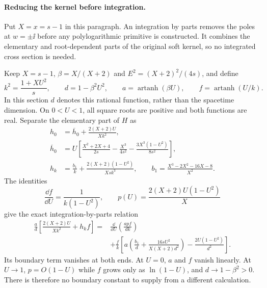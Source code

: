 \paragraph{Reducing the kernel before integration.}
Put $X=x=s-1$ in this paragraph. An integration by parts removes the
poles at $w=\pm\ii$ before any polylogarithmic primitive is constructed.
It combines the elementary and root-dependent parts of the original
soft kernel, so no integrated cross section is needed.

Keep $X=s-1$, $\beta=X/(X+2)$ and $E^2=(X+2)^2/(4s)$, and define
\begin{equation}
 k^2=\frac{1+XU^2}{s},\qquad d=1-\beta^2U^2,\qquad
 a=\operatorname{artanh}(\beta U),\qquad
 f=\operatorname{artanh}(U/k).
\end{equation}
In this section $d$ denotes this rational function, rather than the
spacetime dimension.  On $0<U<1$, all square roots are positive and
both functions are real.  Separate the elementary part of $H$ as
\begin{align}
 h_0&=\overline h_0+\frac{2(X+2)U}{Xk^2},\\
 \overline h_0&=U\left[\frac{X^2+2X+4}{2s}
 -\frac{X^3}{4s^2}-\frac{3X^3(1-U^2)}{8s^2}\right],\\
 h_k&=\frac{b_1}{k}+\frac{2(X+2)(1-U^2)}{Xsk^3},\qquad
 b_1=\frac{X^3-2X^2-16X-8}{X^2}.
\end{align}
The identities
\begin{equation}
 \frac{\dd f}{\dd U}=\frac1{k(1-U^2)},\qquad
 p(U)=\frac{2(X+2)U(1-U^2)}X
\end{equation}
give the exact integration-by-parts relation
\begin{equation}
 \begin{aligned}
 \frac a d\left[\frac{2(X+2)U}{Xk^2}+h_kf\right]
 ={}&\frac{\dd}{\dd U}\left(\frac{apf}{dk}\right)\\
 &+\frac f k\left[
 a\left(\frac{b_1}d+\frac{16sU^2}{X(X+2)d^2}\right)
 -\frac{2U(1-U^2)}{d^2}\right].
 \end{aligned}
 \label{eq:comp-ck-pole-removal}
\end{equation}
Its boundary term vanishes at both ends.  At $U=0$, $a$ and $f$
vanish linearly.  At $U\to1$, $p=O(1-U)$ while $f$ grows only as
$\ln(1-U)$, and $d\to1-\beta^2>0$.  There is therefore no boundary
constant to supply from a different calculation.

